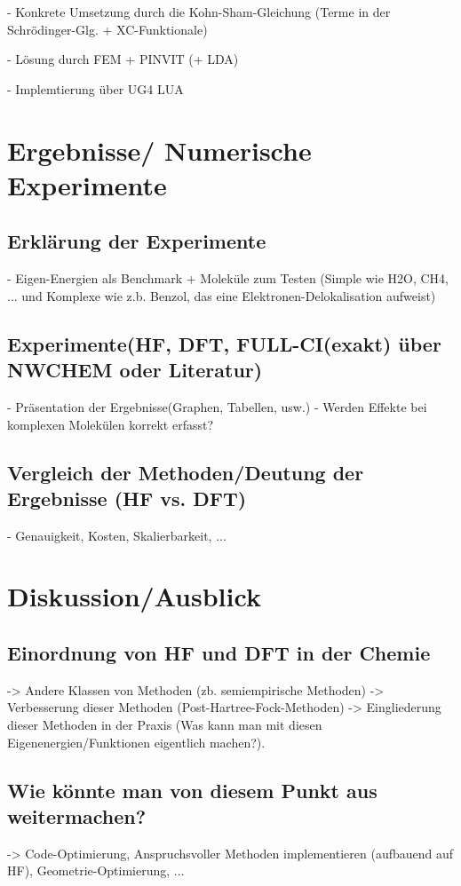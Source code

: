 \documentclass[a4paper, 12pt]{report}
\begin{document}
- Konkrete Umsetzung durch die Kohn-Sham-Gleichung (Terme in der
Schrödinger-Glg. + XC-Funktionale)

- Lösung durch FEM + PINVIT (+ LDA)

- Implemtierung über UG4 LUA

\chapter{Ergebnisse/ Numerische Experimente}
\section{Erklärung der Experimente}
- Eigen-Energien als Benchmark + Moleküle zum Testen (Simple wie
H2O, CH4, ... und Komplexe wie z.b. Benzol, das eine
Elektronen-Delokalisation aufweist)

\section{Experimente(HF, DFT, FULL-CI(exakt) über NWCHEM oder Literatur)}
- Präsentation der Ergebnisse(Graphen, Tabellen, usw.)
- Werden Effekte bei komplexen Molekülen korrekt erfasst?

\section{Vergleich der Methoden/Deutung der Ergebnisse (HF vs. DFT)}
- Genauigkeit, Kosten, Skalierbarkeit, ...

\chapter{Diskussion/Ausblick}
\section{Einordnung von HF und DFT in der Chemie}
-> Andere Klassen von Methoden (zb. semiempirische Methoden)
-> Verbesserung dieser Methoden (Post-Hartree-Fock-Methoden)
-> Eingliederung dieser Methoden in der Praxis (Was kann man mit
diesen Eigenenergien/Funktionen eigentlich machen?).

\section{Wie könnte man von diesem Punkt aus weitermachen?}
-> Code-Optimierung, Anspruchsvoller Methoden implementieren
(aufbauend auf HF), Geometrie-Optimierung, ...



\end{document}
